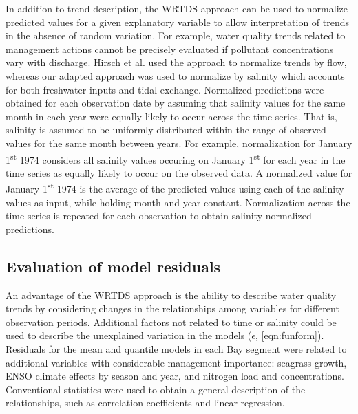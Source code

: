 \documentclass{svjour3}\usepackage[]{graphicx}\usepackage[]{color}
\begin{document}
In addition to trend description, the \ac{WRTDS} approach can be used to normalize predicted values for a given explanatory variable to allow interpretation of trends in the absence of random variation.  For example, water quality trends related to management actions cannot be precisely evaluated if pollutant concentrations vary with discharge.  Hirsch et al. \cite{Hirsch10} used the approach to normalize trends by flow, whereas our adapted approach was used to normalize by salinity which accounts for both freshwater inputs and tidal exchange.  Normalized predictions were obtained for each observation date by assuming that salinity values for the same month in each year were equally likely to occur across the time series.  That is, salinity is assumed to be uniformly distributed within the range of observed values for the same month between years.  For example, normalization for January 1\textsuperscript{st} 1974 considers all salinity values occuring on January 1\textsuperscript{st} for each year in the time series as equally likely to occur on the observed data.  A normalized value for January 1\textsuperscript{st} 1974 is the average of the predicted values using each of the salinity values as input, while holding month and year constant.  Normalization across the time series is repeated for each observation to obtain salinity-normalized predictions.    

\subsection{Evaluation of model residuals}

An advantage of the \ac{WRTDS} approach is the ability to describe water quality trends by considering changes in the relationships among variables for  different observation periods.  Additional factors not related to time or salinity could be used to describe the unexplained variation in the models ($\epsilon$, \cref{eqn:funform}). Residuals for the mean and quantile models in each Bay segment were related to additional variables with considerable management importance: seagrass growth, \ac{ENSO} climate effects by season and year, and nitrogen load and concentrations.  Conventional statistics were used to obtain a general description of the relationships, such as correlation coefficients and linear regression.
\end{document}
